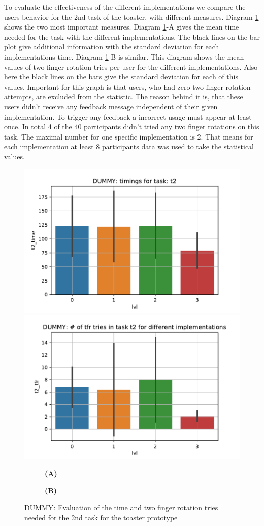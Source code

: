 \documentclass[11pt, a4paper]{article}
\begin{document}
			To evaluate the effectiveness of the different implementations we compare the users behavior for the 2nd task of the toaster, with different measures. Diagram \ref{fig:t2_metrics} shows the two most important measures. Diagram \ref{fig:t2_metrics}-A gives the mean time needed for the task with the different implementations. The black lines on the bar plot give additional information with the standard deviation for each implementations time. Diagram \ref{fig:t2_metrics}-B is similar. This diagram shows the mean values of two finger rotation tries per user for the different implementations. Also here the black lines on the bars give the standard deviation for each of this values. Important for this graph is that users, who had zero two finger rotation attempts, are excluded from the statistic. The reason behind it is, that these users didn't receive any feedback message independent of their given implementation. To trigger any feedback a incorrect usage must appear at least once. In total 4 of the 40 participants didn't tried any two finger rotations on this task. The maximal number for one specific implementation is 2. That means for each implementation at least 8 participants data was used to take the statistical values.

			\begin{figure}[H]
						\centering
						\includegraphics[width=.49\textwidth]{img/plot/plot_time_barplot.pdf}
						\includegraphics[width=.49\textwidth]{img/plot/plot_tfr_barplot.pdf}
						\begin{subfigure}[t]{.49\textwidth}\centering
							\textbf{(A)}
						\end{subfigure}
						\begin{subfigure}[t]{.49\textwidth}\centering
							\textbf{(B)}
						\end{subfigure}
						\caption{DUMMY: Evaluation of the time and two finger rotation tries needed for the 2nd task for the toaster prototype}
						\label{fig:t2_metrics}
					\end{figure}
\end{document}
